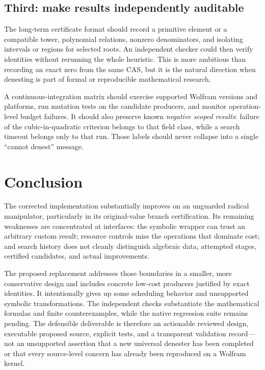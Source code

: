 \documentclass[11pt,letterpaper]{article}
\theoremstyle{definition}
\begin{document}
\subsection{Third: make results independently auditable}

The long-term certificate format should record a primitive element or a compatible tower, polynomial relations, nonzero denominators, and isolating intervals or regions for selected roots. An independent checker could then verify identities without rerunning the whole heuristic. This is more ambitious than recording an exact zero from the same CAS, but it is the natural direction when denesting is part of formal or reproducible mathematical research.

A continuous-integration matrix should exercise supported Wolfram versions and platforms, run mutation tests on the candidate producers, and monitor operation-level budget failures. It should also preserve known \emph{negative scoped results}: failure of the cubic-in-quadratic criterion belongs to that field class, while a search timeout belongs only to that run. Those labels should never collapse into a single ``cannot denest'' message.

\section{Conclusion}

The corrected implementation substantially improves on an unguarded radical manipulator, particularly in its original-value branch certification. Its remaining weaknesses are concentrated at interfaces: the symbolic wrapper can trust an arbitrary custom result; resource controls miss the operations that dominate cost; and search history does not cleanly distinguish algebraic data, attempted stages, certified candidates, and actual improvements.

The proposed replacement addresses those boundaries in a smaller, more conservative design and includes concrete low-cost producers justified by exact identities. It intentionally gives up some scheduling behavior and unsupported symbolic transformations. The independent checks substantiate the mathematical formulas and finite counterexamples, while the native regression suite remains pending. The defensible deliverable is therefore an actionable reviewed design, executable proposed source, explicit tests, and a transparent validation record---not an unsupported assertion that a new universal denester has been completed or that every source-level concern has already been reproduced on a Wolfram kernel.
\end{document}
